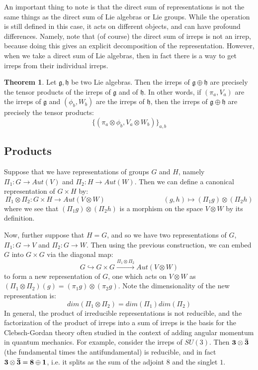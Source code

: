 \documentclass[11pt, oneside]{article}   	%
\theoremstyle{definition}
\newtheorem{theorem}{Theorem}[section]
\begin{document}
An important thing to note is that the direct sum of representations is not the same things as the direct 
sum of Lie algebras or Lie groups. While the operation is still defined in this case, it acts on different objects, 
and can have profound differences. Namely, note that (of course) the direct sum of irreps is not an irrep, 
because doing this gives an explicit decomposition of the representation. However, when we take a direct 
sum of Lie algebras, then in fact there is a way to get irreps from their individual irreps.
\begin{theorem}
	Let $\mathfrak g, \mathfrak h$ be two Lie algebras. Then the irreps of $\mathfrak g\oplus\mathfrak h$ are 
	precisely the tensor products of the irreps of $\mathfrak g$ and of $\mathfrak h$. In other words, if 
	$(\pi_a, V_a)$ are the irreps of $\mathfrak g$ and $(\phi_b, W_b)$ are the irreps of $\mathfrak h$, then 
	the irreps of $\mathfrak g\oplus\mathfrak h$ are precisely the tensor products:
	\begin{equation}
		\{(\pi_a\otimes\phi_b, V_a\otimes W_b)\}_{a, b}
	\end{equation}
\end{theorem}

\subsection{Products}

Suppose that we have representations of groups $G$ and $H$, namely $\Pi_1 : G\rightarrow Aut(V)$ and 
$\Pi_2 : H\rightarrow Aut(W)$. Then we can define a canonical representation of $G\times H$ by:
\begin{equation}
	\Pi_1\otimes\Pi_2 : G\times H\rightarrow Aut(V\otimes W)\;\;\;\;\;\;\;\;\;\;\;\;\;\;\;\;\;\;\;\;\;\;\;\;\;\;\;\;\;\;
	(g, h)\mapsto (\Pi_1 g)\otimes (\Pi_2 h)
\end{equation}
where we see that $(\Pi_1 g)\otimes (\Pi_2 h)$ is a morphism on the space $V\otimes W$ by its 
definition. 

Now, further suppose that $H = G$, and so we have two representations of $G$, $\Pi_1 : G\rightarrow V$ 
and $\Pi_2 : G\rightarrow W$. Then using the previous construction, we can embed $G$ into $G\times G$ 
via the diagonal map:
\begin{equation}
	G\hookrightarrow G\times G \xrightarrow{\Pi_1\otimes\Pi_2} Aut(V\otimes W)
\end{equation}
to form a new representation of $G$, one which acts on $V\otimes W$ as $(\Pi_1\otimes\Pi_2)(g) = 
(\pi_1 g)\otimes (\pi_2 g)$. Note the dimensionality of the new representation is: 
\begin{equation}
	dim(\Pi_1\otimes\Pi_2) = dim(\Pi_1)dim(\Pi_2)
\end{equation}
In general, the product of irreducible representations is not reducible, and 
the factorization of the product of irreps into a sum of irreps is the basis for the Clebsch-Gordan theory 
often studied in the context of adding angular momentum in quantum mechanics. For example, consider 
the irreps of $SU(3)$. Then $\bf 3\otimes\bar 3$ (the fundamental times the antifundamental) is reducible, 
and in fact $\bf 3\otimes\bar 3 = 8\oplus 1$, i.e. it splits as the sum of the adjoint $8$ and the singlet $1$. 
\end{document}
